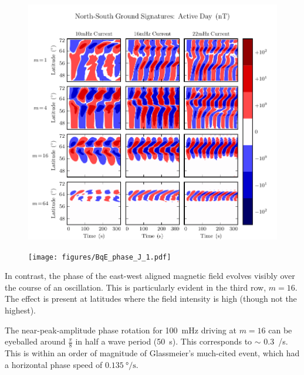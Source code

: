\begin{figure}[H]
    \centering
    \includegraphics[width=\textwidth]{figures/BqE_J_1.pdf}
    \caption[North-South Ground Signatures: Active Day]{}
    \label{fig_BqE_J_1}
\end{figure}

\begin{figure}[H]
    \centering
    \texttt{[image: figures/BqE\_phase\_J\_1.pdf]}
    \caption[North-South Ground Signature Phases: Active Day]{}
    \label{fig_BqE_phase_J_1}
\end{figure}

In contrast, the phase of the east-west aligned magnetic field evolves visibly over the course of an oscillation. This is particularly evident in the third row, $m=16$. The effect is present at latitudes where the field intensity is high (though not the highest). 

The near-peak-amplitude phase rotation for \SI{100}{\mHz} driving at $m=16$ can be eyeballed around $\frac{\pi}{8}$ in half a wave period (\SI{50}{\second}). This corresponds to $\sim$ \SI{0.3}{\deg/\second}. This is within an order of magnitude of Glassmeier's\cite{glassmeier_1999} much-cited event, which had a horizontal phase speed of $\SI{0.135}{\degree/\second}$. 

